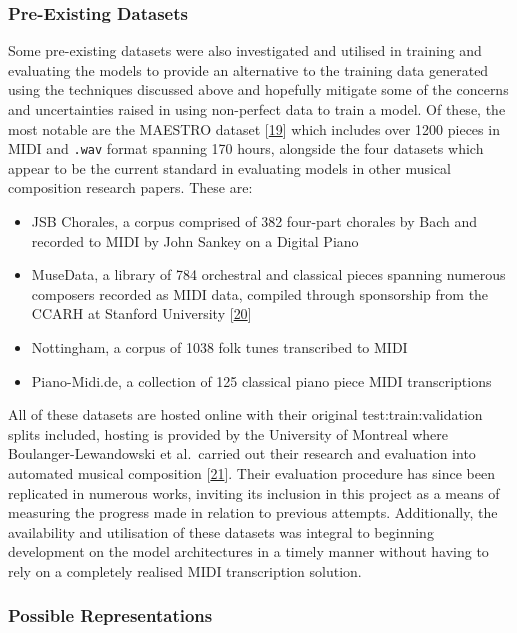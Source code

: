 \documentclass[12pt,]{article}
\providecommand{\tightlist}{%
  \setlength{\itemsep}{0pt}\setlength{\parskip}{0pt}}
\begin{document}
\hypertarget{pre-existing-datasets}{%
\subsubsection{Pre-Existing Datasets}\label{pre-existing-datasets}}

Some pre-existing datasets were also investigated and utilised in
training and evaluating the models to provide an alternative to the
training data generated using the techniques discussed above and
hopefully mitigate some of the concerns and uncertainties raised in
using non-perfect data to train a model. Of these, the most notable are
the MAESTRO dataset {[}\protect\hyperlink{ref-maestro2018}{19}{]} which
includes over 1200 pieces in MIDI and \texttt{.wav} format spanning 170
hours, alongside the four datasets which appear to be the current
standard in evaluating models in other musical composition research
papers. These are:

\begin{itemize}
\tightlist
\item
  JSB Chorales, a corpus comprised of 382 four-part chorales by Bach and
  recorded to MIDI by John Sankey on a Digital Piano
\item
  MuseData, a library of 784 orchestral and classical pieces spanning
  numerous composers recorded as MIDI data, compiled through sponsorship
  from the CCARH at Stanford University
  {[}\protect\hyperlink{ref-ccarh}{20}{]}
\item
  Nottingham, a corpus of 1038 folk tunes transcribed to MIDI
\item
  Piano-Midi.de, a collection of 125 classical piano piece MIDI
  transcriptions
\end{itemize}

All of these datasets are hosted online with their original
test:train:validation splits included, hosting is provided by the
University of Montreal where Boulanger-Lewandowski et al.~carried out
their research and evaluation into automated musical composition
{[}\protect\hyperlink{ref-boulanger2012modeling}{21}{]}. Their
evaluation procedure has since been replicated in numerous works,
inviting its inclusion in this project as a means of measuring the
progress made in relation to previous attempts. Additionally, the
availability and utilisation of these datasets was integral to beginning
development on the model architectures in a timely manner without having
to rely on a completely realised MIDI transcription solution.

\hypertarget{possible-representations}{%
\subsubsection{Possible
Representations}\label{possible-representations}}
\end{document}
